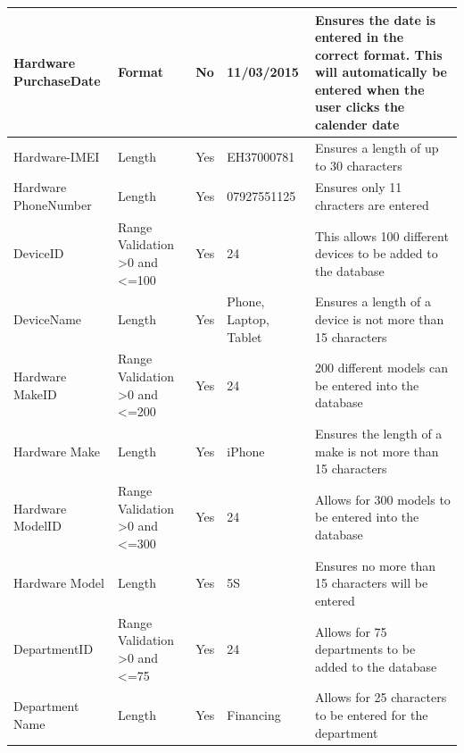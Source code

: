 \begin{center}
\begin{longtable}{|p{2.5cm}|p{2cm}|p{3cm}|p{3cm}|p{3cm}|}
Hardware PurchaseDate               & Format                 &No                  & 11/03/2015              & Ensures the date is entered in the correct format. This will automatically be entered when the user clicks the calender date                       \\ \hline
Hardware-IMEI               & Length              &Yes                     & EH37000781               & Ensures a length of up to 30 characters                      \\ \hline
Hardware PhoneNumber                  & Length            &Yes                      & 07927551125              &   Ensures only 11 chracters are entered                      \\ \hline
DeviceID                     & Range Validation \textgreater0 and \textless=100            &Yes                       & 24                 & This allows 100 different devices to be added to the database                    \\ \hline
DeviceName                         & Length                       &Yes            & Phone, Laptop, Tablet                &  Ensures a length of a device is not more than 15 characters                     \\ \hline
Hardware MakeID                    & Range Validation \textgreater0 and \textless=200      &Yes                             & 24                 & 200 different models can be entered into the database                       \\ \hline
Hardware Make                        & Length               &Yes                    & iPhone                & Ensures the length of a make is not more than 15 characters                      \\ \hline
Hardware ModelID		& Range Validation \textgreater0 and \textless=300                      &Yes             & 24                 & Allows for 300 models to be entered into the database                        \\ \hline
Hardware Model                      & Length            &Yes                       & 5S                    & Ensures no more than 15 characters will be entered                       \\ \hline
DepartmentID 	&Range Validation \textgreater0 and \textless=75	&Yes	& 24		& Allows for 75 departments to be added to the database	\\ \hline
Department Name	& Length	&Yes	& Financing		& Allows for 25 characters to be entered for the department	\\ \hline

\end{longtable}
\end{center}
